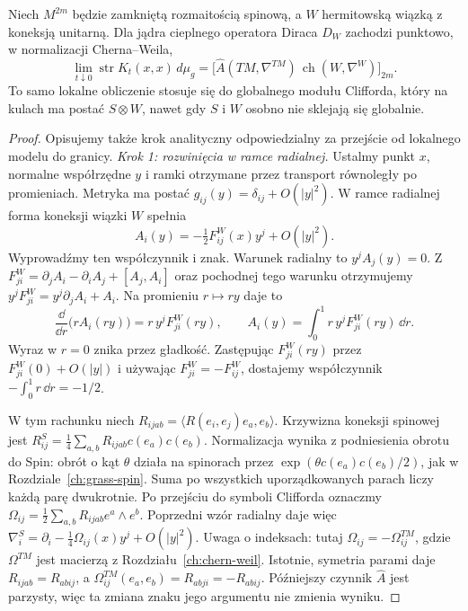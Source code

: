 \begin{lemat}
\label{lem:hodge-local-index}
Niech \(M^{2m}\) będzie zamkniętą rozmaitością
spinową, a \(W\) hermitowską wiązką z koneksją unitarną.
Dla jądra cieplnego operatora Diraca \(D_W\)
zachodzi punktowo, w normalizacji Cherna--Weila,
\begin{equation}\label{eq:hodge-local-index}
 \lim_{t\downarrow0}\operatorname{str}K_t(x,x)\,d\mu_g
 =\bigl[\widehat A(TM,\nabla^{TM})\,
        \operatorname{ch}(W,\nabla^W)\bigr]_{2m}.
\end{equation}
To samo lokalne obliczenie stosuje się do
globalnego modułu Clifforda, który na kulach
ma postać \(S\otimes W\), nawet gdy \(S\) i \(W\)
osobno nie sklejają się globalnie.
\end{lemat}
\begin{proof}
Opisujemy także krok analityczny odpowiedzialny za
przejście od lokalnego modelu do granicy.
\emph{Krok 1: rozwinięcia w ramce radialnej.}
Ustalmy punkt \(x\), normalne współrzędne \(y\)
i ramki otrzymane przez transport równoległy
po promieniach. Metryka ma postać
\(g_{ij}(y)=\delta_{ij}+O(|y|^2)\).
W ramce radialnej forma koneksji wiązki \(W\)
spełnia
\[
 A_i(y)=-\tfrac12F^W_{ij}(x)y^j+O(|y|^2).
\]
Wyprowadźmy ten współczynnik i znak.
Warunek radialny to $y^jA_j(y)=0$.
Z $F^W_{ji}=\partial_jA_i-\partial_iA_j+[A_j,A_i]$
oraz pochodnej tego warunku otrzymujemy
$y^jF^W_{ji}=y^j\partial_jA_i+A_i$.
Na promieniu $r\mapsto ry$ daje to
\[
 \frac{\dd}{\dd r}\bigl(rA_i(ry)\bigr)
   =r\,y^jF^W_{ji}(ry),\qquad
 A_i(y)=\int_0^1 r\,y^jF^W_{ji}(ry)\,\dd r.
\]
Wyraz w $r=0$ znika przez gładkość.
Zastępując $F^W_{ji}(ry)$ przez $F^W_{ji}(0)+O(|y|)$
i używając $F^W_{ji}=-F^W_{ij}$,
dostajemy współczynnik $-\int_0^1r\,\dd r=-1/2$.

W tym rachunku niech
$R_{ijab}=\langle R(e_i,e_j)e_a,e_b\rangle$.
Krzywizna koneksji spinowej jest
$R^S_{ij}=\frac14\sum_{a,b}R_{ijab}c(e_a)c(e_b)$.
Normalizacja wynika z podniesienia obrotu do Spin:
obrót o kąt $\theta$ działa na spinorach przez
$\exp(\theta c(e_a)c(e_b)/2)$, jak w Rozdziale~\ref{ch:grass-spin}.
Suma po wszystkich uporządkowanych parach liczy każdą parę dwukrotnie.
Po przejściu do symboli Clifforda oznaczmy
$\Omega_{ij}=\frac12\sum_{a,b}R_{ijab}e^a\wedge e^b$.
Poprzedni wzór radialny daje więc
$\nabla_i^S=\partial_i-\frac14\Omega_{ij}(x)y^j+O(|y|^2)$.
Uwaga o indeksach: tutaj $\Omega_{ij}=-\Omega^{TM}_{ij}$,
gdzie $\Omega^{TM}$ jest macierzą
z Rozdziału~\ref{ch:chern-weil}.
Istotnie, symetria parami daje $R_{ijab}=R_{abij}$,
a $\Omega^{TM}_{ij}(e_a,e_b)=R_{abji}=-R_{abij}$.
Późniejszy czynnik $\widehat A$ jest parzysty,
więc ta zmiana znaku jego argumentu nie zmienia wyniku.


\end{proof}
